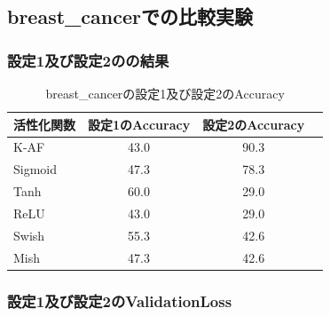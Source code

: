 \subsection{breast\_cancerでの比較実験}
\label{ev:breastcancer}

\subsubsection{設定1及び設定2のの結果}


\begin{table}[htbp]
    \begin{center}
        \caption{breast\_cancerの設定1及び設定2のAccuracy}
        \label{result:breastcancer}
        \vspace{2mm} 
        \begin{tabular}{l*{2}{c}r}
            活性化関数              & 設定1のAccuracy &  設定2のAccuracy \\
            \hline
            K-AF            & 43.0 & 90.3 \\
            Sigmoid            & 47.3 & 78.3\\
            Tanh            & 60.0 & 29.0\\
            ReLU        & 43.0 & 29.0\\
            Swish           & 55.3 & 42.6\\
            Mish           & 47.3 & 42.6\\
    
        \end{tabular}
    \end{center}
\end{table}




\subsubsection{設定1及び設定2のValidationLoss}
\label{breastcancer:loss}

